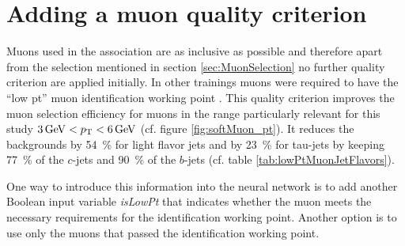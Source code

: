 \section{Adding a muon quality criterion}
Muons used in the association are as inclusive as possible and therefore apart from the selection mentioned in section \ref{sec:MuonSelection} no further quality criterion are applied initially. In other trainings muons were required to have the  ``low pt'' muon identification working point \citep{ATL-PHYS-PUB-2020-002}. This quality criterion improves the muon selection efficiency for muons in the range particularly relevant for this study $\qty[]{3}{GeV}<p_{\text{T}} < \qty[]{6}{GeV}$ (cf. figure \ref{fig:softMuon_pt}). It reduces the backgrounds by \qty{54}{\percent} for light flavor jets and by \qty{23}{\percent} for tau-jets by keeping \qty{77}{\percent} of the $c$-jets and \qty{90}{\percent} of the $b$-jets (cf. table \ref{tab:lowPtMuonJetFlavors}).
\begin{table}[]
  \caption{Fraction of associated low pt working point muons per flavor. Fraction of low pt muons to all associated muons (fractions to table \ref{tab:MuonJetFlavors}), the fraction of muons kept after applying the working point. }%
  \label{tab:lowPtMuonJetFlavors}
  \centering
\end{table}
One way to introduce this information into the neural network is to add another Boolean input variable \textit{isLowPt} that indicates whether the muon meets the necessary requirements for the identification working point. Another option is to use only the muons that passed the identification working point.

